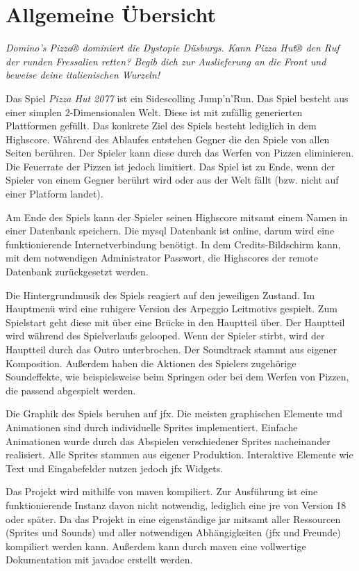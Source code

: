 \section{Allgemeine Übersicht}

\textit{
Domino's Pizza® dominiert die Dystopie Düsburgs.
Kann Pizza Hut® den Ruf der runden Fressalien retten?
Begib dich zur Auslieferung an die Front und beweise deine italienischen Wurzeln!
}

Das Spiel \textit{Pizza Hut 2077} ist ein Sidescolling Jump'n'Run.
Das Spiel besteht aus einer simplen 2-Dimensionalen Welt.
Diese ist mit zufällig generierten Plattformen gefüllt.
Das konkrete Ziel des Spiels besteht lediglich in dem Highscore.
Während des Ablaufes entstehen Gegner die den Spiele von allen Seiten berühren.
Der Spieler kann diese durch das Werfen von Pizzen eliminieren.
Die Feuerrate der Pizzen ist jedoch limitiert.
Das Spiel ist zu Ende, wenn der Spieler von einem Gegner berührt wird oder aus der Welt fällt (bzw. nicht auf einer Platform landet).

Am Ende des Spiels kann der Spieler seinen Highscore mitsamt einem Namen in einer Datenbank speichern.
Die \gls{mysql} Datenbank ist online, darum wird eine funktionierende Internetverbindung benötigt.
In dem Credits-Bildschirm kann, mit dem notwendigen Administrator Passwort, die Highscores der remote Datenbank zurückgesetzt werden.

Die Hintergrundmusik des Spiels reagiert auf den jeweiligen Zustand.
Im Hauptmenü wird eine ruhigere Version des Arpeggio Leitmotivs gespielt.
Zum Spielstart geht diese mit über eine Brücke in den Hauptteil über.
Der Hauptteil wird während des Spielverlaufs gelooped.
Wenn der Spieler stirbt, wird der Hauptteil durch das Outro unterbrochen.
Der Soundtrack stammt aus eigener Komposition.
Außerdem haben die Aktionen des Spielers zugehörige Soundeffekte, wie beispielsweise beim Springen oder bei dem Werfen von Pizzen, die passend abgespielt werden.

Die Graphik des Spiels beruhen auf \gls{jfx}.
Die meisten graphischen Elemente und Animationen sind durch individuelle Sprites implementiert.
Einfache Animationen wurde durch das Abspielen verschiedener Sprites nacheinander realisiert.
Alle Sprites stammen aus eigener Produktion.
Interaktive Elemente wie Text und Eingabefelder nutzen jedoch \gls{jfx} Widgets.

Das Projekt wird mithilfe von \gls{maven} kompiliert.
Zur Ausführung ist eine funktionierende Instanz davon nicht notwendig, lediglich eine \gls{jre} von Version 18 oder später.
Da das Projekt in eine eigenständige \gls{jar} mitsamt aller Ressourcen (Sprites und Sounds) und aller notwendigen Abhängigkeiten (\gls{jfx} und Freunde) kompiliert werden kann.
Außerdem kann durch \gls{maven} eine vollwertige Dokumentation mit \gls{javadoc} erstellt werden.

